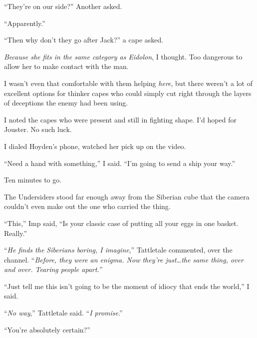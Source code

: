 ``They're on our side?''  Another asked.



``Apparently.''



``Then why don't they go after Jack?'' a cape asked.



\emph{Because she fits in the same category as Eidolon}, I thought.  Too dangerous to allow her to make contact with the man.



I wasn't even that comfortable with them helping \emph{here}, but there weren't a lot of excellent options for thinker capes who could simply cut right through the layers of deceptions the enemy had been using.



I noted the capes who were present and still in fighting shape.  I'd hoped for Jouster.  No such luck.



I dialed Hoyden's phone, watched her pick up on the video.



``Need a hand with something,'' I said.  ``I'm going to send a ship your way.''



\blacksquare



Ten minutes to go.



The Undersiders stood far enough away from the Siberian cube that the camera couldn't even make out the one who carried the thing.



``This,'' Imp said, ``Is your classic case of putting all your eggs in one basket.  Really.''



``\emph{He finds the Siberians boring, I imagine},'' Tattletale commented, over the channel.  ``\emph{Before, they were an enigma.  Now they're just\ldots the same thing, over and over.  Tearing people apart.''}



``Just tell me this isn't going to be the moment of idiocy that ends the world,'' I said.



``\emph{No way},'' Tattletale said.  ``\emph{I promise}.''



``You're absolutely certain?''



